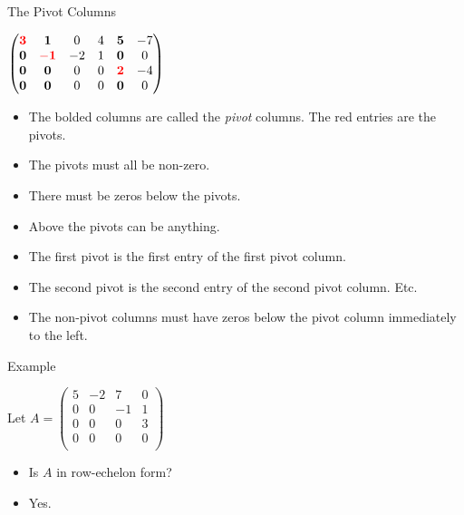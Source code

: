 \documentclass{beamer}
\begin{document}
\begin{frame}{The Pivot Columns}

$
\begin{pmatrix}
\textcolor{red}{\mathbf{3}} & \mathbf{1}                   &  0  & 4 & \mathbf{5}                  & -7 \\
\mathbf{0}                  & \textcolor{red}{\mathbf{-1}} & -2  & 1 & \mathbf{0}                  & 0  \\
\mathbf{0}                  & \mathbf{0}                   &  0  & 0 & \textcolor{red}{\mathbf{2}} & -4 \\
\mathbf{0}                  & \mathbf{0}                   &  0  & 0 & \mathbf{0}                  & 0  \\
\end{pmatrix}
$
\begin{itemize}
\item The bolded columns are called the \emph{pivot} columns. The red entries are the pivots.
\item The pivots must all be non-zero.
\item There must be zeros below the pivots.
\item Above the pivots can be anything.
\item The first pivot is the first entry of the first pivot column.
\item The second pivot is the second entry of the second pivot column. Etc.
\item The non-pivot columns must have zeros below the pivot column immediately to the left.
\end{itemize}

\end{frame}


\begin{frame}{Example}

Let
$
A=
\begin{pmatrix}
5 & -2 &  7  & 0 \\
0 & 0  & -1  & 1 \\
0 & 0  &  0  & 3 \\
0 & 0  &  0  & 0 \\
\end{pmatrix}
$
\begin{itemize}
\item Is $A$ in row-echelon form?
\item Yes.
\end{itemize}

\end{frame}
\end{document}
